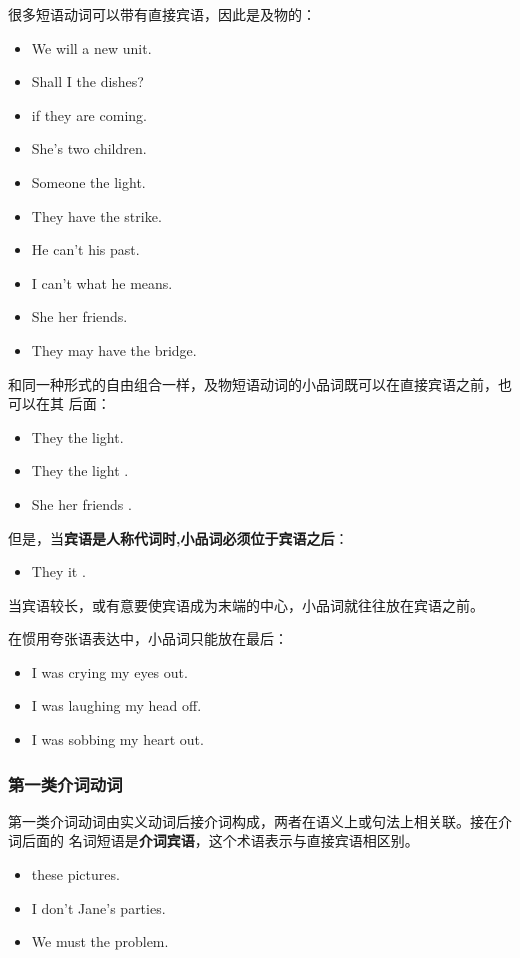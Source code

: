 很多短语动词可以带有直接宾语，因此是及物的：
\begin{itemize}
\item We will  a new unit.
\item Shall I  the dishes?
\item {} if they are coming.
\item She's  two children.
\item Someone  the light.
\item They have  the strike.
\item He can't  his past.
\item I can't  what he means.
\item She  her friends.
\item They may have  the bridge.

\end{itemize}

和同一种形式的自由组合一样，及物短语动词的小品词既可以在直接宾语之前，也可以在其
后面：
\begin{itemize}
\item They  the light.
\item They  the light .
\item She  her friends .
\end{itemize}但是，当\textbf{宾语是人称代词时,小品词必须位于宾语之后}：
\begin{itemize}
\item They  it .
\end{itemize}当宾语较长，或有意要使宾语成为末端的中心，小品词就往往放在宾语之前。

在惯用夸张语表达中，小品词只能放在最后：
\begin{itemize}
\item I was crying my eyes out.

\item I was laughing my head off.
\item I was sobbing my heart out.
\end{itemize}

\subsubsection{第一类介词动词}

第一类介词动词由实义动词后接介词构成，两者在语义上或句法上相关联。接在介词后面的
名词短语是\textbf{介词宾语}，这个术语表示与直接宾语相区别。
\begin{itemize}
\item {} these pictures.

\item I don't  Jane's parties.

\item We must  the problem.

\end{itemize}


